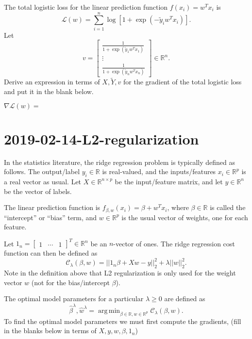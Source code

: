 \documentclass{article}
\DeclareMathOperator*{\argmin}{arg\,min}
\begin{document}
The total logistic
loss for the linear prediction function $f(x_i)=w^T x_i$ is
\begin{equation*}
  \mathcal L(w) = \sum_{i=1}^n \log[ 1+ \exp(-\tilde y_i w^Tx_i)].
\end{equation*}
Let 
\begin{equation*}
  v = \left[
  \begin{array}{c}
    \frac{1}{1+\exp(\tilde y_1 w^T x_1)}\\
    \vdots \\ 
    \frac{1}{1+\exp(\tilde y_n w^T x_n)}
  \end{array}
\right]\in\mathbb R^n.
\end{equation*}
Derive an expression in terms of $X,\tilde Y,v$ for the gradient of the
total logistic loss and put it in the blank below.

\vskip 1in

$\nabla \mathcal L(w)= $\underline{\hspace{2in}}

\newpage
\section{2019-02-14-L2-regularization}
In the statistics literature, the ridge regression problem is
typically defined as follows. The
output/label $ y_i\in\mathbb R$ is real-valued, and the
inputs/features $x_i\in\mathbb R^p$ is a real vector as usual.
Let $X\in \mathbb R^{n\times p}$ be the input/feature matrix, and let
$ y\in\mathbb R^n$ be the vector of labels. 

The linear prediction function is
$f_{\beta,w}(x_i) = \beta + w^T x_i$, where $\beta\in\mathbb R$ is
called the ``intercept'' or ``bias'' term, and $w\in\mathbb R^p$ is
the usual vector of weights, one for each feature.

Let $1_n=\left[
  \begin{array}{ccc}
    1 &\cdots&1
  \end{array}
\right]^T\in\mathbb R^n$ be an $n$-vector of ones. The ridge
regression cost function can then be defined as
\begin{equation*}
  \mathcal C_\lambda(\beta, w) = ||1_n\beta + X w - y||_2^2 + \lambda ||w||_2^2.
\end{equation*}
Note in the definition above that L2 regularization is only used for
the weight vector $w$ (not for the bias/intercept $\beta$).

The optimal model parameters for a particular $\lambda\geq 0$ are
defined as
\begin{equation*}
  \hat \beta^\lambda, \hat w^\lambda = \argmin_{\beta\in\mathbb R, w\in\mathbb R^p}
\mathcal C_\lambda(\beta, w).
\end{equation*}
To find the optimal model parameters we must first compute the
gradients, (fill in the blanks below in terms of $X,y,w,\beta,1_n$)
\end{document}
